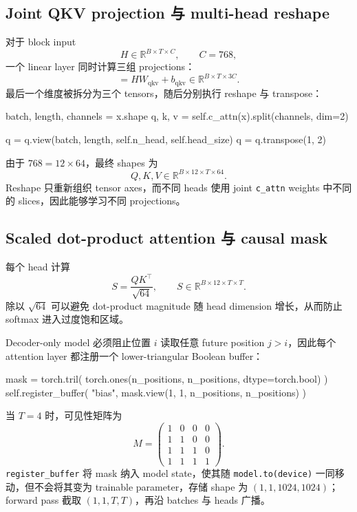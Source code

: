\documentclass[12pt]{article}
\newcommand{\RSpace}{\mathbb R}
\begin{document}
\subsection{Joint QKV projection 与 multi-head reshape}

对于 block input
\[
H\in\RSpace^{B\times T\times C},\qquad C=768,
\]
一个 linear layer 同时计算三组 projections：
\begin{equation}
[Q\ K\ V]=HW_{\mathrm{qkv}}+b_{\mathrm{qkv}}
\in\RSpace^{B\times T\times3C}.
\end{equation}
最后一个维度被拆分为三个 tensors，随后分别执行 reshape 与 transpose：
\begin{pythoncode}[label={lst:qkv}]
batch, length, channels = x.shape
q, k, v = self.c_attn(x).split(channels, dim=2)

q = q.view(batch, length, self.n_head, self.head_size)
q = q.transpose(1, 2)
\end{pythoncode}
由于 $768=12\times64$，最终 shapes 为
\[
Q,K,V\in\RSpace^{B\times12\times T\times64}.
\]
Reshape 只重新组织 tensor axes，而不同 heads 使用 joint \texttt{c\_attn} weights 中不同的 slices，因此能够学习不同 projections。

\subsection{Scaled dot-product attention 与 causal mask}

每个 head 计算
\begin{equation}
S=\frac{QK^\top}{\sqrt{64}},
\qquad S\in\RSpace^{B\times12\times T\times T}.
\end{equation}
除以 $\sqrt{64}$ 可以避免 dot-product magnitude 随 head dimension 增长，从而防止 softmax 进入过度饱和区域。

Decoder-only model 必须阻止位置 $i$ 读取任意 future position $j>i$，因此每个 attention layer 都注册一个 lower-triangular Boolean buffer：
\begin{pythoncode}[label={lst:causal-buffer}]
mask = torch.tril(
    torch.ones(n_positions, n_positions, dtype=torch.bool)
)
self.register_buffer(
    "bias", mask.view(1, 1, n_positions, n_positions)
)
\end{pythoncode}
当 $T=4$ 时，可见性矩阵为
\[
M=\begin{pmatrix}
1&0&0&0\\
1&1&0&0\\
1&1&1&0\\
1&1&1&1
\end{pmatrix}.
\]
\texttt{register\_buffer} 将 mask 纳入 model state，使其随 \texttt{model.to(device)} 一同移动，但不会将其变为 trainable parameter，存储 shape 为 $(1,1,1024,1024)$；forward pass 截取 $(1,1,T,T)$，再沿 batches 与 heads 广播。
\end{document}
